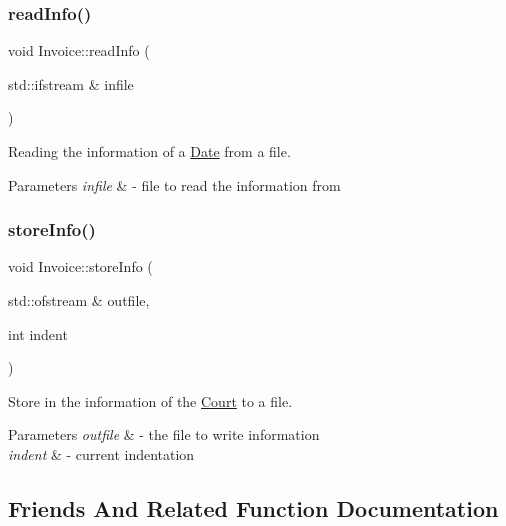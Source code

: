 \subsubsection{\texorpdfstring{read\+Info()}{readInfo()}}
{\footnotesize\ttfamily void Invoice\+::read\+Info (\begin{DoxyParamCaption}\item[{std\+::ifstream \&}]{infile }\end{DoxyParamCaption})}



Reading the information of a \mbox{\hyperlink{class_date}{Date}} from a file. 


\begin{DoxyParams}{Parameters}
{\em infile} & -\/ file to read the information from \\
\hline
\end{DoxyParams}
\mbox{\label{class_invoice_a326f9548d517f1f432939e0c8231a84e}} 
\subsubsection{\texorpdfstring{store\+Info()}{storeInfo()}}
{\footnotesize\ttfamily void Invoice\+::store\+Info (\begin{DoxyParamCaption}\item[{std\+::ofstream \&}]{outfile,  }\item[{int}]{indent }\end{DoxyParamCaption})}



Store in the information of the \mbox{\hyperlink{class_court}{Court}} to a file. 


\begin{DoxyParams}{Parameters}
{\em outfile} & -\/ the file to write information \\
\hline
{\em indent} & -\/ current indentation \\
\hline
\end{DoxyParams}


\subsection{Friends And Related Function Documentation}
\mbox{\label{class_invoice_a1ff3da2cc7abd9df37b2936772ce9ff7}} 
